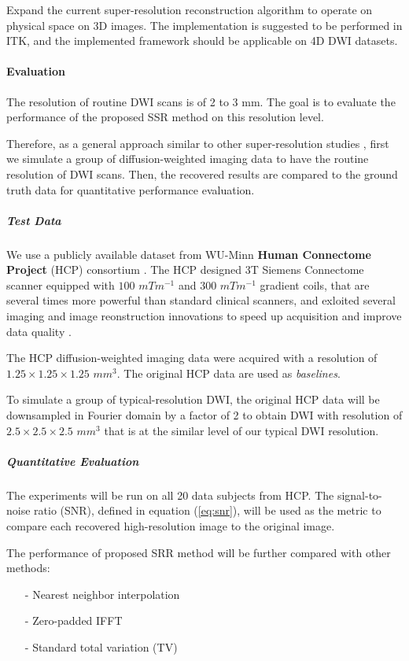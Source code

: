 Expand the current super-resolution reconstruction algorithm to operate on physical space on 3D images.
The implementation is suggested to be performed in ITK, and the implemented framework should be applicable on 4D DWI datasets.

\paragraph{Evaluation}
The resolution of routine DWI scans is of 2 to 3 mm. The goal is to evaluate the performance of the proposed SSR method on this resolution level. 

Therefore, as a general approach similar to other super-resolution studies \cite{brown2014,shi2015}, first we simulate a group of diffusion-weighted imaging data to have the routine resolution of DWI scans. Then, the recovered results are compared to the ground truth data for quantitative performance evaluation.

\subparagraph{Test Data}
We use a publicly available dataset from WU-Minn \textbf{Human Connectome Project} (HCP) consortium \cite{van2013,sotiropoulos2013}.
The HCP designed 3T Siemens Connectome scanner equipped with $100$ $mTm^{-1}$ and $300$ $mTm^{-1}$ gradient coils, that are several times more powerful than standard clinical scanners, and exloited several imaging and image reonstruction innovations to speed up acquisition and improve data quality \cite{sotiropoulos2013}.

The HCP diffusion-weighted imaging data were acquired with a resolution of $1.25 \times 1.25 \times 1.25$ $mm^3$. 
The original HCP data are used as \textit{baselines}.

To simulate a group of typical-resolution DWI, the original HCP data will be downsampled in Fourier domain by a factor of 2 to obtain DWI with resolution of $2.5 \times 2.5 \times 2.5$ $mm^3$ that is at the similar level of our typical DWI resolution.

\subparagraph{Quantitative Evaluation}
The experiments will be run on all 20 data subjects from HCP. The signal-to-noise ratio (SNR), defined in equation (\ref{eq:snr}), will be used as the metric to compare each recovered high-resolution image to the original image.

The performance of proposed SRR method will be further compared with other methods:
\begin{itemize}
\item[-] Nearest neighbor interpolation
\item[-] Zero-padded IFFT
\item[-] Standard total variation (TV)
\end{itemize}

